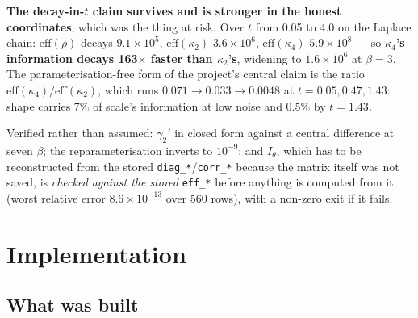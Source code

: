 \documentclass[10pt,a4paper]{article}
\newcommand{\corr}{\rho}
\newcommand{\code}[1]{\texttt{\small #1}}
\newcommand{\st}[1]{\textbf{#1}}
\begin{document}
\st{The decay-in-$t$ claim survives and is stronger in the honest coordinates}, which was the
thing at risk. Over $t$ from 0.05 to 4.0 on the Laplace chain: $\mathrm{eff}(\corr)$ decays
$9.1\times10^5$, $\mathrm{eff}(\kappa_2)$ $3.6\times10^6$, $\mathrm{eff}(\kappa_4)$
$5.9\times10^8$ --- so \st{$\kappa_4$'s information decays 163$\times$ faster than
$\kappa_2$'s}, widening to $1.6\times10^6$ at $\beta=3$. The parameterisation-free form of the
project's central claim is the ratio $\mathrm{eff}(\kappa_4)/\mathrm{eff}(\kappa_2)$, which runs
$0.071 \to 0.033 \to 0.0048$ at $t = 0.05, 0.47, 1.43$: shape carries 7\% of scale's information
at low noise and 0.5\% by $t=1.43$.

Verified rather than assumed: $\gamma_2'$ in closed form against a central difference at seven
$\beta$; the reparameterisation inverts to $10^{-9}$; and $I_\theta$, which has to be
reconstructed from the stored \code{diag\_*}/\code{corr\_*} because the matrix itself was not
saved, is \emph{checked against the stored} \code{eff\_*} before anything is computed from it
(worst relative error $8.6\times10^{-13}$ over 560 rows), with a non-zero exit if it fails.

\section{Implementation}

\subsection{What was built}
\end{document}
